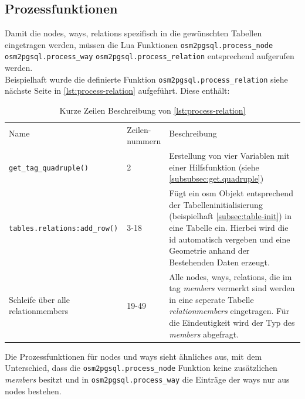 \subsection{Prozessfunktionen}
Damit die nodes, ways, relations spezifisch in die gewünschten Tabellen eingetragen werden, müssen die Lua Funktionen \lstinline|osm2pgsql.process_node| \lstinline|osm2pgsql.process_way| \lstinline|osm2pgsql.process_relation| entsprechend aufgerufen werden. \\
Beispielhaft wurde die definierte Funktion \lstinline|osm2pgsql.process_relation| siehe nächste Seite in \autoref{lst:process-relation} aufgeführt.
Diese enthält:
\begin{table}[h]
	\caption{Kurze Zeilen Beschreibung von \autoref{lst:process-relation}}
	\renewcommand{\arraystretch}{1.2}
	\begin{tabularx}{\linewidth}{|l|l|X|}\hline
		Name & \multirow{2}{*}{\parbox{1.6cm}{Zeilen-\\ nummern}} & Beschreibung\\
		&& \\\hline
		\lstinline|get_tag_quadruple()| & 2 & Erstellung von vier Variablen mit einer Hilfsfunktion (siehe \autoref{subsubsec:get.quadruple})\\\hline
		\lstinline|tables.relations:add_row()| & 3-18 & Fügt ein osm Objekt entsprechend der Tabelleninitialisierung (beispielhaft \autoref{subsec:table-init}) in eine Tabelle ein. \newline Hierbei wird die id automatisch vergeben und eine Geometrie anhand der Bestehenden Daten erzeugt.\\\hline
		Schleife über alle relationmembers & 19-49 & Alle nodes, ways, relations, die im tag \textit{members} vermerkt sind werden in eine seperate Tabelle \textit{relationmembers} eingetragen. Für die Eindeutigkeit wird der Typ des \textit{members} abgefragt. \\\hline
	\end{tabularx}
\end{table}

Die Prozessfunktionen für nodes und ways sieht ähnliches aus, mit dem Unterschied, dass die \lstinline|osm2pgsql.process_node| Funktion keine zusätzlichen \textit{members} besitzt und in \lstinline|osm2pgsql.process_way| die Einträge der ways nur aus nodes bestehen.

